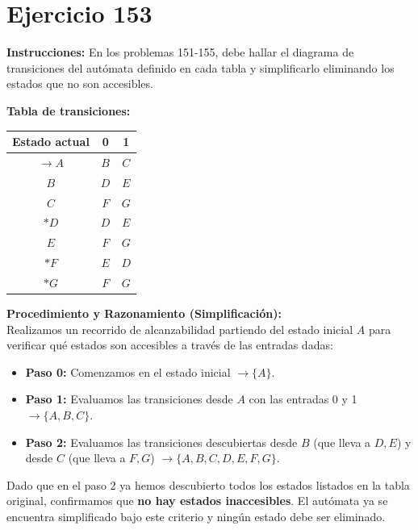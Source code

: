 \documentclass[12pt]{article}
\begin{document}
\section*{Ejercicio 153}

\textbf{Instrucciones:} En los problemas 151-155, debe hallar el diagrama de transiciones del autómata definido en cada tabla y simplificarlo eliminando los estados que no son accesibles.

\vspace{0.5cm}

\textbf{Tabla de transiciones:}

\begin{center}
\begin{tabular}{|c|c|c|}
\hline
\textbf{Estado actual} & \textbf{0} & \textbf{1} \\
\hline
$\rightarrow A$ & $B$ & $C$ \\
\hline
$B$ & $D$ & $E$ \\
\hline
$C$ & $F$ & $G$ \\
\hline
$*D$ & $D$ & $E$ \\
\hline
$E$ & $F$ & $G$ \\
\hline
$*F$ & $E$ & $D$ \\
\hline
$*G$ & $F$ & $G$ \\
\hline
\end{tabular}
\end{center}

\vspace{0.5cm}

\textbf{Procedimiento y Razonamiento (Simplificación):} \\
Realizamos un recorrido de alcanzabilidad partiendo del estado inicial $A$ para verificar qué estados son accesibles a través de las entradas dadas:
\begin{itemize}
    \item \textbf{Paso 0:} Comenzamos en el estado inicial $\rightarrow \{A\}$.
    \item \textbf{Paso 1:} Evaluamos las transiciones desde $A$ con las entradas 0 y 1 $\rightarrow \{A, B, C\}$.
    \item \textbf{Paso 2:} Evaluamos las transiciones descubiertas desde $B$ (que lleva a $D, E$) y desde $C$ (que lleva a $F, G$) $\rightarrow \{A, B, C, D, E, F, G\}$.
\end{itemize}
Dado que en el paso 2 ya hemos descubierto todos los estados listados en la tabla original, confirmamos que \textbf{no hay estados inaccesibles}. El autómata ya se encuentra simplificado bajo este criterio y ningún estado debe ser eliminado.
\end{document}
